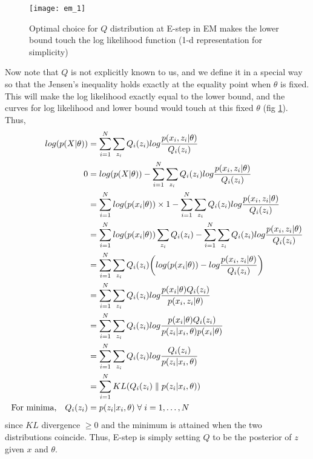 \documentclass[../statistical_learning_notes.tex]{subfiles}
\begin{document}
\begin{figure}[h]
\texttt{[image: em\_1]}
\centering
\caption{Optimal choice for $Q$ distribution at E-step in EM makes the lower bound touch the log likelihood function (1-d representation for simplicity)}
\label{fig:em_1} %
\end{figure}

Now note that $Q$ is not explicitly known to us, and we define it in a special way so that the Jensen's inequality holds exactly at the equality point when $\theta$ is fixed. This will make the log likelihood exactly equal to the lower bound, and the curves for log likelihood and lower bound would touch at this fixed $\theta$ (fig \ref{fig:em_1}). Thus,
\begin{align*}
    log(p(X|\theta)) &= \sum_{i=1}^{N} \sum_{z_{i}} Q_{i}(z_{i}) log \frac{p(x_{i}, z_{i}|\theta)}{Q_{i}(z_{i})}\\
    0 &= log(p(X|\theta)) - \sum_{i=1}^{N} \sum_{z_{i}} Q_{i}(z_{i}) log \frac{p(x_{i}, z_{i}|\theta)}{Q_{i}(z_{i})}\\
    &= \sum_{i=1}^{N}log(p(x_{i}|\theta)) \times 1 - \sum_{i=1}^{N} \sum_{z_{i}} Q_{i}(z_{i}) log \frac{p(x_{i}, z_{i}|\theta)}{Q_{i}(z_{i})}\\
    &= \sum_{i=1}^{N}log(p(x_{i}|\theta)) \sum_{z_{i}}Q_{i}(z_{i}) - \sum_{i=1}^{N} \sum_{z_{i}} Q_{i}(z_{i}) log \frac{p(x_{i}, z_{i}|\theta)}{Q_{i}(z_{i})}\\
    &= \sum_{i=1}^{N} \sum_{z_{i}}Q_{i}(z_{i}) \bigg( log(p(x_{i}|\theta)) - log \frac{p(x_{i}, z_{i}|\theta)}{Q_{i}(z_{i})} \bigg)\\
    &= \sum_{i=1}^{N} \sum_{z_{i}}Q_{i}(z_{i}) log \frac{p(x_{i}|\theta) Q_{i}(z_{i})}{p(x_{i}, z_{i}|\theta)}\\
    &= \sum_{i=1}^{N} \sum_{z_{i}}Q_{i}(z_{i}) log \frac{p(x_{i}|\theta) Q_{i}(z_{i})}{p(z_{i}|x_{i},\theta)p(x_{i}|\theta)}\\
    &= \sum_{i=1}^{N} \sum_{z_{i}}Q_{i}(z_{i}) log\frac{Q_{i}(z_{i})}{p(z_{i}|x_{i},\theta)}\\
    &= \sum_{i=1}^{N} KL(Q_{i}(z_{i}) \parallel p(z_{i}|x_{i},\theta))\\
    \text{For minima,} \quad Q_{i}(z_{i}) &= p(z_{i}|x_{i},\theta) \; \forall \; i = 1,\ldots,N
\end{align*}
since $KL$ divergence $\geq 0$ and the minimum is attained when the two distributions coincide. Thus, E-step is simply setting $Q$ to be the posterior of $z$ given $x$ and $\theta$.\newline
\end{document}

